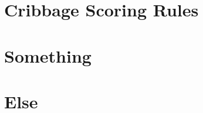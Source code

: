 
\section{Cribbage Scoring Rules}
\label{app:scoring_rules}


\section{Something}
\label{app:something}

\section{Else}
\label{app:else}

